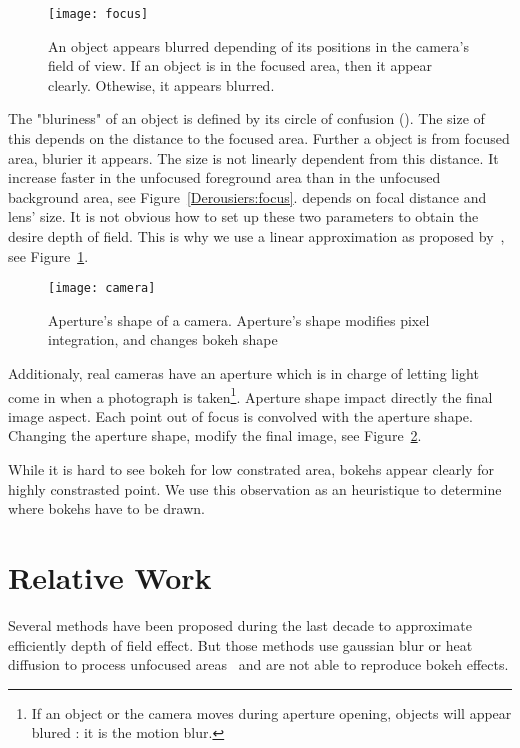 	\begin{figure}[htb]\centering
	\texttt{[image: focus]}
	\caption{An object appears blurred depending of its positions in the camera's field of view. 
If an object is in the focused area, then it appear clearly. Othewise, it appears blurred. }
	\label{DeRousiers:focus}
	\end{figure}


The "bluriness" of an object is defined by its circle of confusion (\coc). The size of this \coc depends on the distance to the focused area. Further a object is from focused area, blurier it appears. The \coc size is not linearly dependent from this distance. It increase faster in the unfocused foreground area than in the unfocused background area, see Figure~\ref{Derousiers:focus}. \coc depends on focal distance and lens' size. It is not obvious how to set up these two parameters to obtain the desire depth of field. This is why we use a linear approximation as proposed by~\cite{Hammon07}, see Figure~\ref{DeRousiers:focus}.

	\begin{figure}[htb]\centering
	\texttt{[image: camera]}
	\caption{Aperture's shape of a camera. Aperture's shape modifies pixel integration, and changes bokeh shape }
	\label{DeRousiers:camera}
	\end{figure}

Additionaly, real cameras have an aperture which is in charge of letting light come in when a photograph is taken\footnote{If an object or the camera moves during aperture opening, objects will appear blured : it is the motion blur.}. Aperture shape impact directly the final image aspect. Each point out of focus is convolved with the aperture shape. Changing the aperture shape, modify the final image, see Figure~\ref{DeRousiers:camera}.

While it is hard to see bokeh for low constrated area, bokehs appear clearly for highly constrasted point. We use this observation as an heuristique to determine where bokehs have to be drawn.

\section{Relative Work}\label{Derousiers:RelativeWork}

Several methods have been proposed during the last decade to approximate efficiently depth of field effect. But those methods use gaussian blur or heat diffusion to process unfocused areas~\cite{Kosloff07,Hammon07} and are not able to reproduce bokeh effects.

